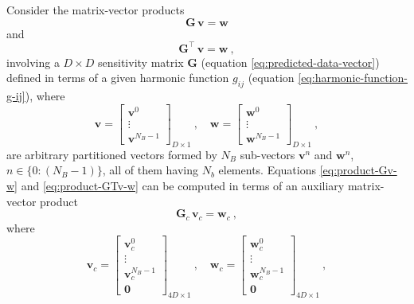 Consider the matrix-vector products
\begin{equation}
	\mathbf{G} \, \mathbf{v} = \mathbf{w}
	\label{eq:product-Gv-w}
\end{equation}
and
\begin{equation}
	\mathbf{G}^{\top} \, \mathbf{v} = \mathbf{w} \: ,
	\label{eq:product-GTv-w}
\end{equation}
involving a $D \times D$ sensitivity matrix $\mathbf{G}$ (equation \ref{eq:predicted-data-vector}) defined in terms of a given
harmonic function $g_{ij}$ (equation \ref{eq:harmonic-function-g-ij}), where 
\begin{equation}
	\mathbf{v} = \begin{bmatrix}
		\mathbf{v}^{0} \\ \vdots \\ \mathbf{v}^{N_{B}-1}
	\end{bmatrix}_{D \times 1} \: , \quad 
	\mathbf{w} = \begin{bmatrix}
		\mathbf{w}^{0} \\ \vdots \\ \mathbf{w}^{N_{B}-1}
	\end{bmatrix}_{D \times 1} \: ,
	\label{eq:vectors-v-w}
\end{equation}
are arbitrary partitioned vectors formed by $N_{B}$ sub-vectors $\mathbf{v}^{n}$ and $\mathbf{w}^{n}$,
$n \in \{ 0 : (N_{B} - 1) \}$, all of them having $N_{b}$ elements.
Equations \ref{eq:product-Gv-w} and \ref{eq:product-GTv-w} can be computed in terms of an auxiliary matrix-vector product
\begin{equation}
	\mathbf{G}_{c} \, \mathbf{v}_{c} = \mathbf{w}_{c} \: ,
	\label{eq:aux-BCCB-system}
\end{equation}
where 
\begin{equation}
	\mathbf{v}_{c} = \begin{bmatrix}
		\mathbf{v}_{c}^{0} \\ \vdots \\ \mathbf{v}_{c}^{N_{B}-1} \\ \mathbf{0}
	\end{bmatrix}_{4D \times 1} \: , \quad 
	\mathbf{w}_{c} = \begin{bmatrix}
		\mathbf{w}_{c}^{0} \\ \vdots \\ \mathbf{w}_{c}^{N_{B}-1} \\ \mathbf{0}
	\end{bmatrix}_{4D \times 1} \: ,
	\label{eq:vectors-vc-wc}
\end{equation}
